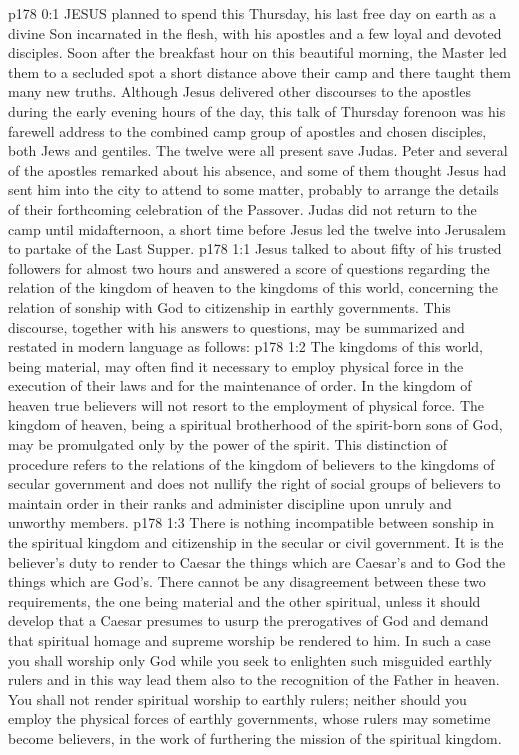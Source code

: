 \vs p178 0:1 JESUS planned to spend this Thursday, his last free day on earth as a divine Son incarnated in the flesh, with his apostles and a few loyal and devoted disciples. Soon after the breakfast hour on this beautiful morning, the Master led them to a secluded spot a short distance above their camp and there taught them many new truths. Although Jesus delivered other discourses to the apostles during the early evening hours of the day, this talk of Thursday forenoon was his farewell address to the combined camp group of apostles and chosen disciples, both Jews and gentiles. The twelve were all present save Judas. Peter and several of the apostles remarked about his absence, and some of them thought Jesus had sent him into the city to attend to some matter, probably to arrange the details of their forthcoming celebration of the Passover. Judas did not return to the camp until midafternoon, a short time before Jesus led the twelve into Jerusalem to partake of the Last Supper.
\vs p178 1:1 Jesus talked to about fifty of his trusted followers for almost two hours and answered a score of questions regarding the relation of the kingdom of heaven to the kingdoms of this world, concerning the relation of sonship with God to citizenship in earthly governments. This discourse, together with his answers to questions, may be summarized and restated in modern language as follows:
\vs p178 1:2 \pc The kingdoms of this world, being material, may often find it necessary to employ physical force in the execution of their laws and for the maintenance of order. In the kingdom of heaven true believers will not resort to the employment of physical force. The kingdom of heaven, being a spiritual brotherhood of the spirit\hyp{}born sons of God, may be promulgated only by the power of the spirit. This distinction of procedure refers to the relations of the kingdom of believers to the kingdoms of secular government and does not nullify the right of social groups of believers to maintain order in their ranks and administer discipline upon unruly and unworthy members.
\vs p178 1:3 There is nothing incompatible between sonship in the spiritual kingdom and citizenship in the secular or civil government. It is the believer’s duty to render to Caesar the things which are Caesar’s and to God the things which are God’s. There cannot be any disagreement between these two requirements, the one being material and the other spiritual, unless it should develop that a Caesar presumes to usurp the prerogatives of God and demand that spiritual homage and supreme worship be rendered to him. In such a case you shall worship only God while you seek to enlighten such misguided earthly rulers and in this way lead them also to the recognition of the Father in heaven. You shall not render spiritual worship to earthly rulers; neither should you employ the physical forces of earthly governments, whose rulers may sometime become believers, in the work of furthering the mission of the spiritual kingdom.
